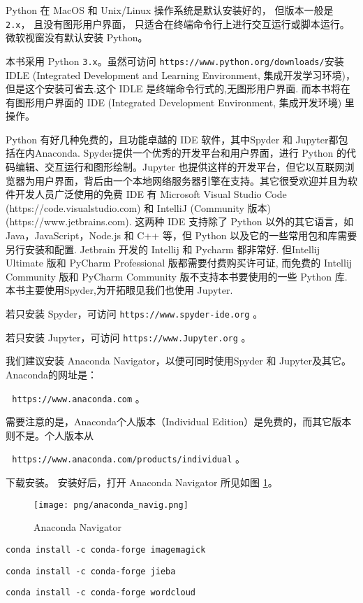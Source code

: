 \documentclass[main.tex]{subfiles}
\begin{document}
Python 在 MacOS 和 Unix/Linux 操作系统是默认安装好的，
但版本一般是 \texttt{2.x}，
且没有图形用户界面，
只适合在终端命令行上进行交互运行或脚本运行。
微软视窗没有默认安装 Python。

本书采用 Python \texttt{3.x}。虽然可访问 \texttt{https://www.python.org/downloads/}安装 IDLE (Integrated Development and Learning Environment, 集成开发学习环境)，但是这个安装可省去.这个 IDLE 是终端命令行式的,无图形用户界面.
而本书将在有图形用户界面的 IDE (Integrated Development Environment, 集成开发环境) 里操作。

Python 有好几种免费的，且功能卓越的 IDE 软件，其中Spyder 和 Jupyter都包括在内Anaconda. Spyder提供一个优秀的开发平台和用户界面，进行 Python 的代码编辑、交互运行和图形绘制。Jupyter 也提供这样的开发平台，但它以互联网浏览器为用户界面，背后由一个本地网络服务器引擎在支持。其它很受欢迎并且为软件开发人员广泛使用的免费 IDE 有 Microsoft Visual Studio Code (https://code.visualstudio.com) 和 IntelliJ (Community 版本)
 (https://www.jetbrains.com).
这两种 IDE 支持除了 Python 以外的其它语言，如 Java，JavaScript，Node.js 和 C++ 等，但 Python 以及它的一些常用包和库需要另行安装和配置. Jetbrain 开发的 Intellij 和 Pycharm 都非常好. 但Intellij Ultimate 版和 PyCharm Professional 版都需要付费购买许可证, 而免费的 Intellij Community 版和 PyCharm Community 版不支持本书要使用的一些 Python 库. 本书主要使用Spyder,为开拓眼见我们也使用 Jupyter.


若只安装 Spyder，可访问
\texttt{https://www.spyder-ide.org} 。

若只安装 Jupyter，可访问
\texttt{https://www.Jupyter.org} 。

我们建议安装 Anaconda Navigator，以便可同时使用Spyder 和 Jupyter及其它。 Anaconda的网址是：

\,\,\,\,\texttt{https://www.anaconda.com} 。

\noindent 需要注意的是，Anaconda个人版本（Individual Edition）是免费的，而其它版本则不是。个人版本从

\,\,\,\,\texttt{https://www.anaconda.com/products/individual} 。

\noindent 下载安装。
安装好后，打开 Anaconda Navigator 所见如图 \ref{fig:2.1.1}。

\begin{figure}[h]
	\texttt{[image: png/anaconda\_navig.png]}
	\caption{Anaconda Navigator}\label{fig:2.1.1}
\end{figure}


\texttt{conda install -c conda-forge imagemagick}

\texttt{conda install -c conda-forge jieba}

\texttt{conda install -c conda-forge wordcloud}
\end{document}
